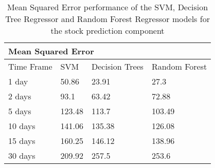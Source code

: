         \begin{table}[h]
            
            \begin{subtable}{\linewidth}
            \centering
            \begin{tabular}{|l|l|l|l|}
            \multicolumn{4}{l}{Mean Squared Error}                                                                                                                                                    \\ 
            \hline
            Time Frame & SVM                                       & Decision Trees                            & Random Forest                                                                        \\ 
            \hline
            1 day      & 50.86                                     & 23.91                                     & 27.3                                                                                 \\ 
            \hline
            2 days     & {93.1}   & {63.42}  & {72.88}                                             \\ 
            \hline
            5 days     & {123.48} & {113.7}  & {103.49}                                            \\ 
            \hline
            10 days    & {141.06} & {135.38} & {126.08}  \\ 
            \hline
            15 days    & {160.25} & {146.12} & {138.96}                                            \\ 
            \hline
            30 days    & {209.92} & {257.5}  & {253.6}                                             \\
            \hline
            \end{tabular}
            \bigskip
            \caption{Mean Squared Error performance of the SVM, Decision Tree Regressor and Random Forest Regressor models for the stock prediction component}
            \label{Table: pred_MSE}
            \end{subtable}
            
            \bigskip
            

\end{table}
